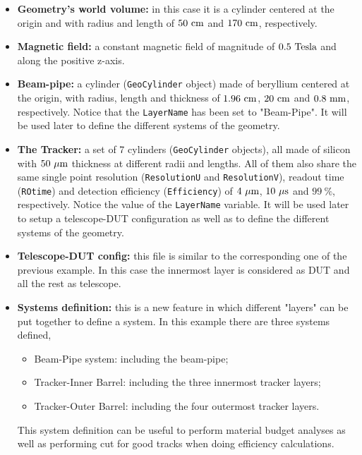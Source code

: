 \begin{itemize}
 \item  {\bf Geometry's world volume:} in this case it is a cylinder centered at the origin and with radius and length of $50~{\rm cm}$ and $170~{\rm cm}$, 
 respectively.
 
 \item  {\bf Magnetic field:} a constant magnetic field of magnitude of $0.5~{\rm Tesla}$ and along the positive z-axis.
 
 \item  {\bf Beam-pipe:} a cylinder ({\tt GeoCylinder} object) made of beryllium centered at the origin, with radius, length and thickness of $1.96~{\rm cm}$, $20~{\rm cm}$ and $0.8~{\rm mm}$, 
 respectively. Notice that the {\tt LayerName} has been set to "Beam-Pipe". It will be used later to define the different systems of the geometry.
 
 \item  {\bf The Tracker:} a set of 7 cylinders ({\tt GeoCylinder} objects), all made of silicon with $50~{\rm \mu m}$ thickness at different radii and lengths. All of 
 them also share the same single point resolution ({\tt ResolutionU} and {\tt ResolutionV}), readout time ({\tt ROtime}) and detection efficiency ({\tt Efficiency}) 
 of $4~{\rm \mu m}$, $10~{\rm \mu s}$ and $99~\%$, respectively. Notice the value of the {\tt LayerName} variable. It will be used later to setup a telescope-DUT 
 configuration as well as to define the different systems of the geometry.
 
 \item  {\bf Telescope-DUT config:} this file is similar to the corresponding one of the previous example. In this case the innermost layer is considered as DUT 
 and all the rest as telescope.
 
 \item  {\bf Systems definition:} this is a new feature in which different "layers" can be put together to define a system. In this example there are three 
 systems defined,
 \begin{itemize}
  \item  Beam-Pipe system: including the beam-pipe;
  
  \item  Tracker-Inner Barrel: including the three innermost tracker layers;
  
  \item  Tracker-Outer Barrel: including the four outermost tracker layers.
 \end{itemize}
  This system definition can be useful to perform material budget analyses as well as performing cut for good tracks when doing
  efficiency calculations.
  

\end{itemize}
